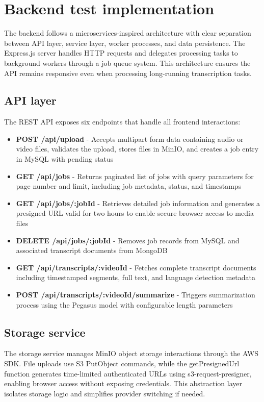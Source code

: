 \section{Backend test implementation}
The backend follows a microservices-inspired architecture with clear separation between API layer, service layer, worker processes, and data persistence. The Express.js server handles HTTP requests and delegates processing tasks to background workers through a job queue system. This architecture ensures the API remains responsive even when processing long-running transcription tasks.
\subsection{API layer}
The REST API exposes six endpoints that handle all frontend interactions:
\begin{itemize}
    \item \textbf{POST /api/upload} - Accepts multipart form data containing audio or video files, validates the upload, stores files in MinIO, and creates a job entry in MySQL with pending status
    \item \textbf{GET /api/jobs} - Returns paginated list of jobs with query parameters for page number and limit, including job metadata, status, and timestamps
    \item \textbf{GET /api/jobs/:jobId} - Retrieves detailed job information and generates a presigned URL valid for two hours to enable secure browser access to media files
    \item \textbf{DELETE /api/jobs/:jobId} - Removes job records from MySQL and associated transcript documents from MongoDB
    \item \textbf{GET /api/transcripts/:videoId} - Fetches complete transcript documents including timestamped segments, full text, and language detection metadata
    \item \textbf{POST /api/transcripts/:videoId/summarize} - Triggers summarization process using the Pegasus model with configurable length parameters
\end{itemize}

\subsection{Storage service}
The storage service manages MinIO object storage interactions through the AWS SDK. File uploads use S3 PutObject commands, while the getPresignedUrl function generates time-limited authenticated URLs using s3-request-presigner, enabling browser access without exposing credentials. This abstraction layer isolates storage logic and simplifies provider switching if needed.

